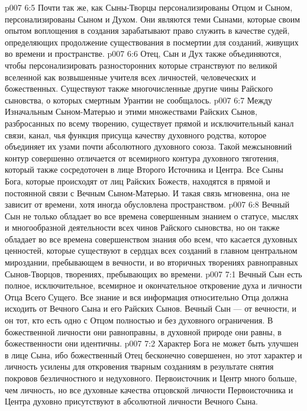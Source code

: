 \vs p007 6:5 \pc Почти так же, как Сыны\hyp{}Творцы персонализированы Отцом и Сыном,  персонализированы Сыном и Духом. Они являются теми Сынами, которые своим опытом воплощения в создания зарабатывают право служить в качестве судей, определяющих продолжение существования в посмертии для созданий, живущих во времени и пространстве.
\vs p007 6:6 \pc Отец, Сын и Дух также объединяются, чтобы персонализировать разносторонних  которые странствуют по великой вселенной как возвышенные учителя всех личностей, человеческих и божественных. Существуют также многочисленные другие чины Райского сыновства, о которых смертным Урантии не сообщалось.
\vs p007 6:7 \pc Между Изначальным Сыном\hyp{}Матерью и этими множествами Райских Сынов, разбросанных по всему творению, существует прямой и исключительный канал связи, канал, чья функция присуща качеству духовного родства, которое объединяет их узами почти абсолютного духовного союза. Такой межсыновний контур совершенно отличается от всемирного контура духовного тяготения, который также сосредоточен в лице Второго Источника и Центра. Все Сыны Бога, которые происходят от лиц Райских Божеств, находятся в прямой и постоянной связи с Вечным Сыном\hyp{}Матерью. И такая связь мгновенна, она не зависит от времени, хотя иногда обусловлена пространством.
\vs p007 6:8 Вечный Сын не только обладает во все времена совершенным знанием о статусе, мыслях и многообразной деятельности всех чинов Райского сыновства, но он также обладает во все времена совершенством знания обо всем, что касается духовных ценностей, которые существуют в сердцах всех созданий в главном центральном мироздании, пребывающем в вечности, и во вторичных творениях равноправных Сынов\hyp{}Творцов, творениях, пребывающих во времени.
\vs p007 7:1 Вечный Сын есть полное, исключительное, всемирное и окончательное откровение духа и личности Отца Всего Сущего. Все знание и вся информация относительно Отца должна исходить от Вечного Сына и его Райских Сынов. Вечный Сын --- от вечности, и он тот, кто есть одно с Отцом полностью и без духовного ограничения. В божественной личности они равноправны, в духовной природе они равны, в божественности они идентичны.
\vs p007 7:2 Характер Бога не может быть улучшен в лице Сына, ибо божественный Отец бесконечно совершенен, но этот характер и личность усилены для откровения тварным созданиям в результате снятия покровов безличностного и недуховного. Первоисточник и Центр много больше, чем личность, но все духовные качества отцовской личности Первоисточника и Центра духовно присутствуют в абсолютной личности Вечного Сына.
